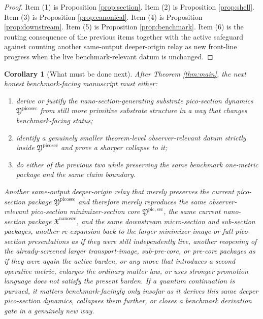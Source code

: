 \documentclass[11pt]{article}
\newcommand{\NanoSectionPackage}{\mathfrak X^{\mathrm{nanosec}}}
\newcommand{\PicoSectionPackage}{\mathfrak Y^{\mathrm{picosec}}}
\newcommand{\PicoMinSectionCore}{\mathfrak Y^{\mathrm{pic,sec}}}
\newtheorem{corollary}{Corollary}
\begin{document}
\begin{proof}
Item (1) is Proposition \ref{prop:section}. Item (2) is Proposition \ref{prop:shell}. Item (3) is Proposition \ref{prop:canonical}. Item (4) is Proposition \ref{prop:downstream}. Item (5) is Proposition \ref{prop:benchmark}. Item (6) is the routing consequence of the previous items together with the active safeguard against counting another same-output deeper-origin relay as new front-line progress when the live benchmark-relevant datum is unchanged.
\end{proof}

\begin{corollary}[What must be done next]
\label{cor:next}
After Theorem \ref{thm:main}, the next honest benchmark-facing manuscript must either:
\begin{enumerate}
    \item derive or justify the nano-section-generating substrate pico-section dynamics \(\PicoSectionPackage\) from still more primitive substrate structure in a way that changes benchmark-facing status;
    \item identify a genuinely smaller theorem-level observer-relevant datum strictly inside \(\PicoSectionPackage\) and prove a sharper collapse to it;
    \item do either of the previous two while preserving the same benchmark one-metric package and the same claim boundary.
\end{enumerate}
Another same-output deeper-origin relay that merely preserves the current pico-section package \(\PicoSectionPackage\) and therefore merely reproduces the same observer-relevant pico-section minimizer-section core \(\PicoMinSectionCore\), the same current nano-section package \(\NanoSectionPackage\), and the same downstream micro-section and sub-section packages, another re-expansion back to the larger minimizer-image or full pico-section presentations as if they were still independently live, another reopening of the already-screened larger transport-image, sub-pre-core, or pre-core packages as if they were again the active burden, or any move that introduces a second operative metric, enlarges the ordinary matter law, or uses stronger promotion language does not satisfy the present burden. If a quantum continuation is pursued, it matters benchmark-facingly only insofar as it derives this same deeper pico-section dynamics, collapses them further, or closes a benchmark derivation gate in a genuinely new way.
\end{corollary}
\end{document}
